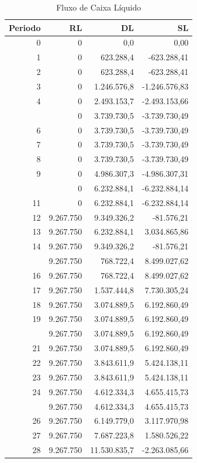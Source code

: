 \documentclass[
  10pt,
  a4paper]{article}
\begin{document}
\begin{longtable}[t]{rrrr}
\caption{\label{tab:FCL}Fluxo de Caixa Líquido}\\
\toprule
Periodo & RL & DL & SL\\
\midrule
0 & 0 & 0,0 & 0,00\\
1 & 0 & 623.288,4 & -623.288,41\\
2 & 0 & 623.288,4 & -623.288,41\\
3 & 0 & 1.246.576,8 & -1.246.576,83\\
4 & 0 & 2.493.153,7 & -2.493.153,66\\
\addlinespace
5 & 0 & 3.739.730,5 & -3.739.730,49\\
6 & 0 & 3.739.730,5 & -3.739.730,49\\
7 & 0 & 3.739.730,5 & -3.739.730,49\\
8 & 0 & 3.739.730,5 & -3.739.730,49\\
9 & 0 & 4.986.307,3 & -4.986.307,31\\
\addlinespace
10 & 0 & 6.232.884,1 & -6.232.884,14\\
11 & 0 & 6.232.884,1 & -6.232.884,14\\
12 & 9.267.750 & 9.349.326,2 & -81.576,21\\
13 & 9.267.750 & 6.232.884,1 & 3.034.865,86\\
14 & 9.267.750 & 9.349.326,2 & -81.576,21\\
\addlinespace
15 & 9.267.750 & 768.722,4 & 8.499.027,62\\
16 & 9.267.750 & 768.722,4 & 8.499.027,62\\
17 & 9.267.750 & 1.537.444,8 & 7.730.305,24\\
18 & 9.267.750 & 3.074.889,5 & 6.192.860,49\\
19 & 9.267.750 & 3.074.889,5 & 6.192.860,49\\
\addlinespace
20 & 9.267.750 & 3.074.889,5 & 6.192.860,49\\
21 & 9.267.750 & 3.074.889,5 & 6.192.860,49\\
22 & 9.267.750 & 3.843.611,9 & 5.424.138,11\\
23 & 9.267.750 & 3.843.611,9 & 5.424.138,11\\
24 & 9.267.750 & 4.612.334,3 & 4.655.415,73\\
\addlinespace
25 & 9.267.750 & 4.612.334,3 & 4.655.415,73\\
26 & 9.267.750 & 6.149.779,0 & 3.117.970,98\\
27 & 9.267.750 & 7.687.223,8 & 1.580.526,22\\
28 & 9.267.750 & 11.530.835,7 & -2.263.085,66\\

\end{longtable}
\end{document}
